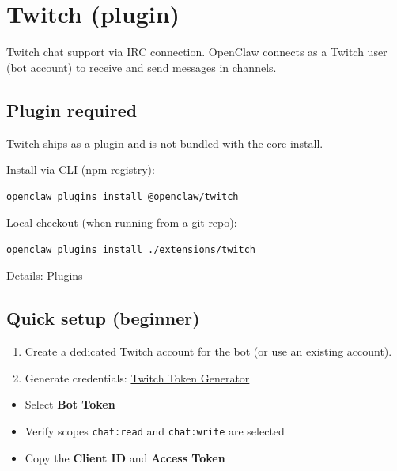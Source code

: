\clearpage

\section{Twitch (plugin)}


Twitch chat support via IRC connection. OpenClaw connects as a Twitch user (bot account) to receive and send messages in channels.

\subsection{Plugin required}


Twitch ships as a plugin and is not bundled with the core install.

Install via CLI (npm registry):

\begin{lstlisting}[language=bash]
openclaw plugins install @openclaw/twitch
\end{lstlisting}


Local checkout (when running from a git repo):

\begin{lstlisting}[language=bash]
openclaw plugins install ./extensions/twitch
\end{lstlisting}


Details: \href{/tools/plugin}{Plugins}

\subsection{Quick setup (beginner)}


\begin{enumerate}
  \item Create a dedicated Twitch account for the bot (or use an existing account).
  \item Generate credentials: \href{https://twitchtokengenerator.com/}{Twitch Token Generator}
\end{enumerate}

\begin{itemize}
  \item Select \textbf{Bot Token}
  \item Verify scopes \texttt{chat:read} and \texttt{chat:write} are selected
  \item Copy the \textbf{Client ID} and \textbf{Access Token}
\end{itemize}

